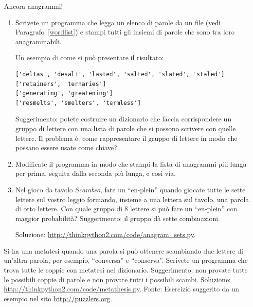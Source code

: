 \documentclass[10pt]{book}
\begin{document}
\vspace{0.2in}
\begin{exercise}
\label{anagrams}

Ancora anagrammi!

\begin{enumerate}

\item Scrivete un programma che legga un elenco di parole da un file (vedi Paragrafo~\ref{wordlist}) e stampi tutti gli insiemi di parole che sono tra loro anagrammabili.

Un esempio di come si può presentare il risultato:

\begin{verbatim}
['deltas', 'desalt', 'lasted', 'salted', 'slated', 'staled']
['retainers', 'ternaries']
['generating', 'greatening']
['resmelts', 'smelters', 'termless']
\end{verbatim}
%
Suggerimento: potete costruire un dizionario che faccia corrispondere un gruppo di lettere con una lista di parole che si possono scrivere con quelle lettere. Il problema è: come rappresentare il gruppo di lettere in modo che possano essere usate come chiave?

\item Modificate il programma in modo che stampi la lista di anagrammi più lunga per prima, seguita dalla seconda più lunga, e così via.

\item Nel gioco da tavolo {\em Scarabeo}, fate un ``en-plein'' quando giocate tutte le sette lettere sul vostro leggio formando, insieme a una lettera sul tavolo, una parola di otto lettere. Con quale gruppo di 8 lettere si può fare un ``en-plein'' con maggior probabilità?
Suggerimento: il gruppo dà sette combinazioni.


Soluzione: \url{http://thinkpython2.com/code/anagram_sets.py}.

\end{enumerate}
\end{exercise}

\vspace{0.2in}
\begin{exercise}

Si ha una metatesi quando una parola si può ottenere scambiando due lettere di un'altra parola, per esempio, ``conversa'' e ``conserva''.  Scrivete un programma che trova tutte le coppie con metatesi nel dizionario. Suggerimento: non provate tutte le possibili coppie di parole e non provate tutti i possibili scambi. Soluzione: \url{http://thinkpython2.com/code/metathesis.py}.
Fonte: Esercizio suggerito da un esempio nel sito \url{http://puzzlers.org}.

\end{exercise}
\end{document}

